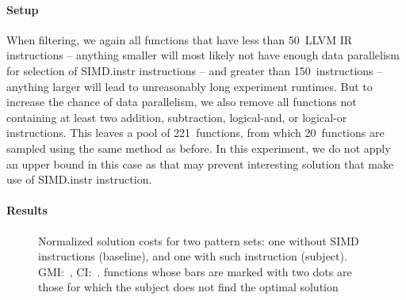 \paragraph{Setup}

When filtering, we again all \glspl{function} that have less than
\num{50}~\gls{LLVM} \gls{IR} \glspl{instruction} -- anything smaller will most
likely not have enough data parallelism for selection of \gls{SIMD.instr}
\glspl{instruction} -- and greater than \num{150}~\glspl{instruction} --
anything larger will lead to unreasonably long experiment runtimes.
%
But to increase the chance of data parallelism, we also remove all
\glspl{function} not containing at least two addition, subtraction, logical-and,
or logical-or \glspl{instruction}.
%
This leaves a pool of \num{221}~\glspl{function}, from which
\num{20}~\glspl{function} are sampled using the same method as before.
%
In this experiment, we do not apply an upper bound in this case as that may
prevent interesting \gls{solution} that make use of \gls{SIMD.instr}
\gls{instruction}.


\paragraph{Results}



\begin{figure}
  \centering%
  \maxsizebox{\textwidth}{!}{%
    \trimBarchartPlot{%
    }%
  }

  \caption[Plot for evaluating the impact of SIMD instructions on code quality]%
          {%
            Normalized solution costs for two pattern sets: one without SIMD
            instructions (baseline), and one with such instruction (subject).
            GMI:~\printGMI{%
              \SimdVsWithoutCyclesSpeedupCyclesRegularSpeedupGmean%
            },
            CI:~\printGMICI{%
              \SimdVsWithoutCyclesSpeedupCyclesRegularSpeedupCiMin%
            }{%
              \SimdVsWithoutCyclesSpeedupCyclesRegularSpeedupCiMax%
            }.
            \Glspl{function} whose bars are marked with two dots are those
            for which the \gls{subject} does not find the optimal solution%
          }
\end{figure}

